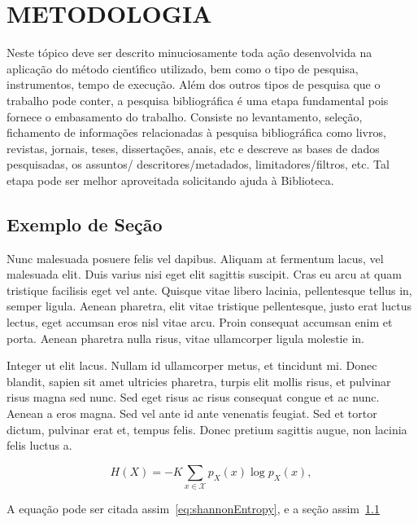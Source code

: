 %

\chapter{METODOLOGIA}
\label{cap:cap02}

Neste t\'{o}pico deve ser descrito minuciosamente toda a\c{c}\~{a}o desenvolvida na aplica\c{c}\~{a}o do m\'{e}todo cient\'{\i}fico utilizado, bem como o tipo de pesquisa, instrumentos, tempo de execu\c{c}\~{a}o.
Al\'{e}m dos outros tipos de pesquisa que o trabalho pode conter, a pesquisa bibliogr\'{a}fica \'{e} uma etapa fundamental pois fornece o embasamento do trabalho. Consiste no levantamento, sele\c{c}\~{a}o, fichamento de informa\c{c}\~{o}es relacionadas \`{a} pesquisa bibliogr\'{a}fica como livros, revistas, jornais, teses, disserta\c{c}\~{o}es, anais, etc e descreve as bases de dados pesquisadas, os assuntos/ descritores/metadados, limitadores/filtros, etc. Tal etapa pode ser melhor aproveitada solicitando ajuda \`{a} Biblioteca.
\cite{Cover2006,Feynman1998,Haykin2001}

\section{Exemplo de Se\c{c}\~{a}o}
\label{sec:sec02}

Nunc malesuada posuere felis vel dapibus. Aliquam at fermentum lacus, vel malesuada elit. Duis varius nisi eget elit sagittis suscipit. Cras eu arcu at quam tristique facilisis eget vel ante. Quisque vitae libero lacinia, pellentesque tellus in, semper ligula. Aenean pharetra, elit vitae tristique pellentesque, justo erat luctus lectus, eget accumsan eros nisl vitae arcu. Proin consequat accumsan enim et porta. Aenean pharetra nulla risus, vitae ullamcorper ligula molestie in.

Integer ut elit lacus. Nullam id ullamcorper metus, et tincidunt mi. Donec blandit, sapien sit amet ultricies pharetra, turpis elit mollis risus, et pulvinar risus magna sed nunc. Sed eget risus ac risus consequat congue et ac nunc. Aenean a eros magna. Sed vel ante id ante venenatis feugiat. Sed et tortor dictum, pulvinar erat et, tempus felis. Donec pretium sagittis augue, non lacinia felis luctus a.

\begin{equation}
H(X) =-K\sum_{x\in\mathcal{X}} p_X(x)\log p_X(x),
\label{eq:shannonEntropy}
\end{equation}

A equa\c{c}\~{a}o pode ser citada assim~\eqref{eq:shannonEntropy}, e a se\c{c}\~{a}o assim~\ref{sec:sec02}

